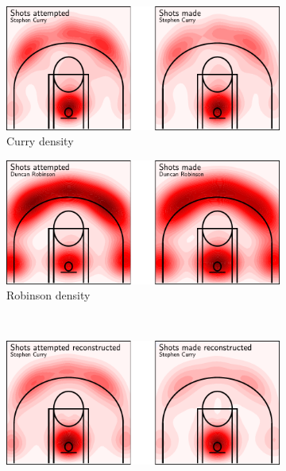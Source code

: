 \begin{figure}
    \centering
    \begin{subfigure}[b]{0.45\textwidth}
        \centering
        \includegraphics[width=\textwidth]{figures/curry_density.pdf}
        \caption{Curry density}
        \label{fig:curry_density}
    \end{subfigure}
    \hfill
    \begin{subfigure}[b]{0.45\textwidth}
        \centering
        \includegraphics[width=\textwidth]{figures/robinson_density.pdf}
        \caption{Robinson density}
        \label{fig:robinson_density}
    \end{subfigure}
    \\
    \begin{subfigure}[b]{0.45\textwidth}
        \centering
        \includegraphics[width=\textwidth]{figures/curry_gram.pdf}

\end{subfigure}
\end{figure}
